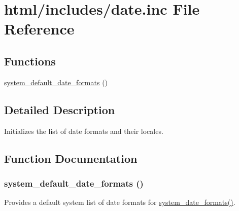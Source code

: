 \hypertarget{date_8inc}{
\section{html/includes/date.inc File Reference}
\label{date_8inc}
}
\subsection*{Functions}
\begin{DoxyCompactItemize}
\item 
\hyperlink{date_8inc_ad3ea657e0b6761414b33adc1066f70a5}{system\_\-default\_\-date\_\-formats} ()
\end{DoxyCompactItemize}


\subsection{Detailed Description}
Initializes the list of date formats and their locales. 

\subsection{Function Documentation}
\hypertarget{date_8inc_ad3ea657e0b6761414b33adc1066f70a5}{
\subsubsection[{system\_\-default\_\-date\_\-formats}]{\setlength{\rightskip}{0pt plus 5cm}system\_\-default\_\-date\_\-formats ()}}
\label{date_8inc_ad3ea657e0b6761414b33adc1066f70a5}
Provides a default system list of date formats for \hyperlink{system_8module_a07720daca9cb101f5fd80ef97a3a2d85}{system\_\-date\_\-formats()}. 